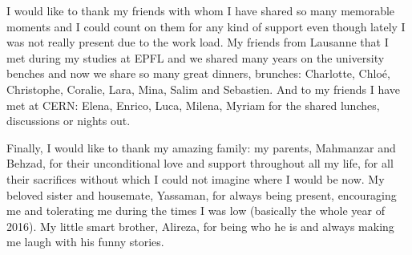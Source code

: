 I would like to thank my friends with whom I have shared so many
memorable moments and I could count on them for any kind of support
even though lately I was not really present due to the work load. My
friends from Lausanne that I met during my studies at EPFL and we
shared many years on the university benches and now we share so many
great dinners, brunches: Charlotte, Chloé, Christophe, Coralie, Lara,
Mina, Salim and Sebastien. And to my friends I have met at CERN:
Elena, Enrico, Luca, Milena, Myriam for the shared lunches,
discussions or nights out.

Finally, I would like to thank my amazing family: my parents,
Mahmanzar and Behzad, for their unconditional love and support
throughout all my life, for all their sacrifices without which I could
not imagine where I would be now. My beloved sister and housemate,
Yassaman, for always being present, encouraging me and tolerating me
during the times I was low (basically the whole year of 2016). My
little smart brother, Alireza, for being who he is and always making
me laugh with his funny stories.



